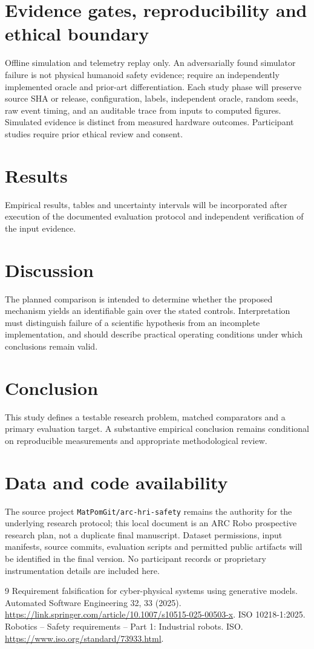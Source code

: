 \documentclass[11pt,a4paper]{article}
\begin{document}
\section{Evidence gates, reproducibility and ethical boundary}
Offline simulation and telemetry replay only. An adversarially found simulator failure is not physical humanoid safety evidence; require an independently implemented oracle and prior-art differentiation. Each study phase will preserve source SHA or release, configuration, labels, independent oracle, random seeds, raw event timing, and an auditable trace from inputs to computed figures. Simulated evidence is distinct from measured hardware outcomes. Participant studies require prior ethical review and consent.

\section{Results}
Empirical results, tables and uncertainty intervals will be incorporated after execution of the documented evaluation protocol and independent verification of the input evidence.

\section{Discussion}
The planned comparison is intended to determine whether the proposed mechanism yields an identifiable gain over the stated controls. Interpretation must distinguish failure of a scientific hypothesis from an incomplete implementation, and should describe practical operating conditions under which conclusions remain valid.

\section{Conclusion}
This study defines a testable research problem, matched comparators and a primary evaluation target. A substantive empirical conclusion remains conditional on reproducible measurements and appropriate methodological review.

\section{Data and code availability}
The source project \texttt{MatPomGit/arc-hri-safety} remains the authority for the underlying research protocol; this local document is an ARC Robo prospective research plan, not a duplicate final manuscript. Dataset permissions, input manifests, source commits, evaluation scripts and permitted public artifacts will be identified in the final version. No participant records or proprietary instrumentation details are included here.
\begin{thebibliography}{9}
 Requirement falsification for cyber-physical systems using generative models. Automated Software Engineering 32, 33 (2025). \url{https://link.springer.com/article/10.1007/s10515-025-00503-x}.
 ISO 10218-1:2025. Robotics -- Safety requirements -- Part 1: Industrial robots. ISO. \url{https://www.iso.org/standard/73933.html}.
\end{thebibliography}
\end{document}

